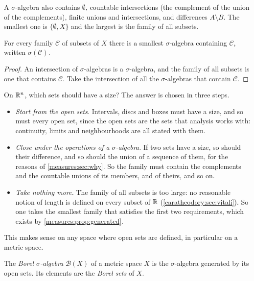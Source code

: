 \begin{notechapter}
A $\sigma$-algebra also contains $\emptyset$, countable intersections
(the complement of the union of the complements), finite unions and
intersections, and differences $A\setminus B$. The smallest one is
$\{\emptyset, X\}$ and the largest is the family of all subsets.

\begin{proposition}\label{measures:prop:generated}
For every family $\mathcal C$ of subsets of $X$ there is a smallest
$\sigma$-algebra containing $\mathcal C$, written $\sigma(\mathcal C)$.
\end{proposition}

\begin{proof}
An intersection of $\sigma$-algebras is a $\sigma$-algebra, and the
family of all subsets is one that contains $\mathcal C$. Take the
intersection of all the $\sigma$-algebras that contain $\mathcal C$.
\end{proof}

On $\mathbb{R}^n$, which sets should have a size? The answer is chosen in three
steps.
\begin{itemize}[nosep]
  \item \emph{Start from the open sets.} Intervals, discs and boxes
        must have a size, and so must every open set, since the open
        sets are the sets that analysis works with: continuity, limits
        and neighbourhoods are all stated with them.
  \item \emph{Close under the operations of a $\sigma$-algebra.} If two
        sets have a size, so should their difference, and so should
        the union of a sequence of them, for the reasons of
        \cref{measures:sec:why}. So the family must contain the
        complements and the countable unions of its members, and of
        theirs, and so on.
  \item \emph{Take nothing more.} The family of all subsets is too
        large: no reasonable notion of length is defined on every
        subset of $\mathbb{R}$ (\cref{caratheodory:sec:vitali}). So one takes
        the smallest family that satisfies the first two requirements,
        which exists by \cref{measures:prop:generated}.
\end{itemize}
This makes sense on any space where open sets are defined, in
particular on a metric space.

\begin{definition}\label{measures:def:borel}
The \emph{Borel $\sigma$-algebra} $\mathcal B(X)$ of a metric space $X$
is the $\sigma$-algebra generated by its open sets. Its elements are
the \emph{Borel sets} of $X$.
\end{definition}


\end{notechapter}
